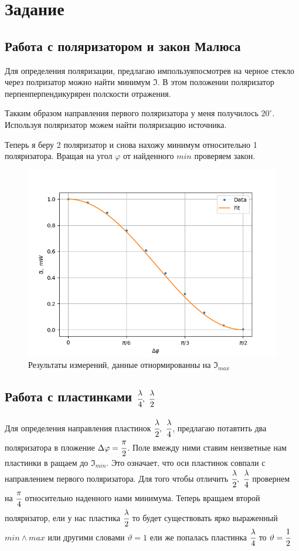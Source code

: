 \section{Задание}

\subsection{Работа с поляризатором и закон Малюса}
Для определения поляризации, предлагаю импользуяпосмотрев на 
черное стекло через полризатор можно найти минимум $\mathfrak{I}$. 
В этом положении поляризатор перпенперпендикурярен полскости отражения.

Такким образом направления первого поляризатора у меня получилось 
$20^\circ$. Используя поляризатор можем найти поляризацию источника. 

Теперь я беру 2 поляризатор и снова нахожу минимум 
относительно 1 поляризатора. Вращая на угол $\varphi$ от 
найденного $min$ проверяем закон. 

\begin{figure}[h]
    \centering
    \includegraphics[trim={0 0 0 0},clip,width=\textwidth]{Ex_1/Task_1_1.png}
     \caption{Результаты измерений, данные отнормированны на $\mathfrak{I}_{max}$}
    \label{Task_1_1}
\end{figure}

\subsection{Работа с пластинками $\cfrac{\lambda}{4}, \ \cfrac{\lambda}{2}$}

Для определения направления пластинок 
$\cfrac{\lambda}{2}, \ \cfrac{\lambda}{4}$, предлагаю потавтить 
два поляризатора в пложение $\Delta \varphi = \cfrac{\pi}{2}$. 
Поле вмежду ними ставим неизветные нам пластинки в ращаем до 
$\mathfrak{I}_{min}$. Это означает, что оси пластинок совпали 
с направлением первого поляризатора. Для того чтобы отличить 
$\cfrac{\lambda}{2}, \ \cfrac{\lambda}{4}$ провернем на 
$\cfrac{\pi}{4}$ относительно наденного нами минимума. 
Теперь вращаем второй поляризатор, ели у нас пластика $\cfrac{\lambda}{2}$ 
то будет существовать ярко выраженный $min \land max$ или другими словами 
$\vartheta = 1$ ели же попалась пластинка $\cfrac{\lambda}{4}$ то $\vartheta = \cfrac{1}{2}$   


